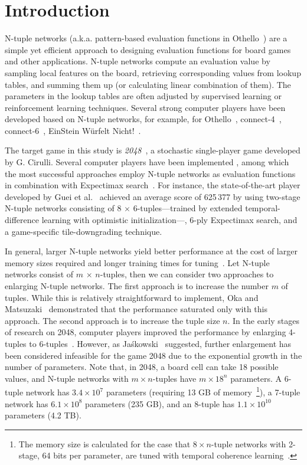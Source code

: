\section{Introduction}

N-tuple networks (a.k.a. pattern-based evaluation functions in Othello~\cite{Buro98}) are a simple yet
efficient approach to designing evaluation functions for board games and other applications.
N-tuple networks compute an evaluation value by sampling local features on the board, retrieving corresponding values from lookup tables, and summing them up (or calculating linear combination of them).
The parameters in the lookup tables are often adjusted by supervised learning or reinforcement learning techniques.
Several strong computer players have been developed based on N-tuple networks, for example,  for Othello~\cite{Buro98,Jask14,NgIL12,KuSM25}, \mbox{connect-4}~\cite{ThKK12}, connect-6~\cite{HuQP18}, EinStein W\"urfelt Nicht!~\cite{CHHH24,HsHs25}.

The target game in this study is \emph{2048}~\cite{2048}, a stochastic single-player game developed by G. Cirulli.
Several computer players have been implemented \cite{Mats21,ASOH22,GuCW22,SzJa14,YWHC16,Jask18,KGWW22,Zhou19,WaMa25}, among which the most successful approaches employ N-tuple networks as evaluation functions~\cite{SzJa14} in combination with Expectimax search~\cite{YWHC16}.
For instance, the state-of-the-art player developed by Guei et al.~\cite{GuCW22} achieved an average score of 625\,377 by using two-stage N-tuple networks consisting of 8 $\times$ 6-tuples---trained by extended temporal-difference learning with optimistic initialization---, 6-ply Expectimax search, and a game-specific tile-downgrading technique.


In general, larger N-tuple networks yield better performance at the cost of larger memory sizes required and longer training times for tuning~\cite{TeMa25}.
Let N-tuple networks consist of $m$ $\times$ $n$-tuples, then we can consider two approaches to enlarging N-tuple networks.
The first approach is to increase the number $m$ of tuples.  While this is relatively straightforward to implement, Oka and Matsuzaki~\cite{OkMa16} demonstrated that the performance saturated only with this approach.
The second approach is to increase the tuple size $n$.  In the early stages of research on 2048, computer players improved the performance by enlarging 4-tuples to 6-tuples~\cite{SzJa14,YWHC16}.  However, as Ja\'skowski~\cite{Jask18} suggested, further enlargement has been considered infeasible for the game 2048 due to the exponential growth in the number of parameters.  Note that, in 2048, a board cell can take 18 possible values, and N-tuple networks with $m$\,$\times$\,$n$-tuples have $m\times 18^n$ parameters.  A 6-tuple network has $3.4\times 10^7$ parameters (requiring 13 GB of memory~\footnote{The memory size is calculated for the case that 8\,$\times$\,$n$-tuple networks with 2-stage, 64 bits per parameter, are tuned with temporal coherence learning~\cite{Jask18}.}), a 7-tuple network has $6.1\times 10^8$ parameters (235 GB), and an 8-tuple has $1.1\times 10^{10}$ parameters (4.2 TB).


